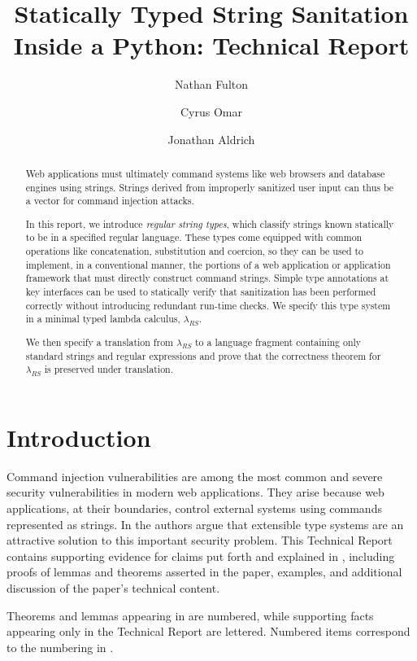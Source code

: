 \documentclass[12pt]{article}
\title{Statically Typed String Sanitation Inside a Python: Technical Report}
\author{Nathan Fulton\and Cyrus Omar\and Jonathan Aldrich}
\theoremstyle{definition}
\begin{document}
\linenumbers

\maketitle

\begin{abstract}
Web applications must ultimately command systems like web browsers and database engines using strings. Strings derived from improperly sanitized user input  can thus be a vector for command injection attacks. 

In this report, we introduce \emph{regular string types}, which classify strings known statically to be in a specified regular language. These types come equipped with common operations like concatenation, substitution and coercion, so they  can be used to implement, in a conventional manner, the portions of a web application or application framework that must directly construct command strings. Simple type annotations at key interfaces can be used to statically verify that sanitization has been performed correctly without introducing redundant run-time checks. We specify this type system in a minimal typed lambda calculus, $\lambda_{RS}$.

We then specify a translation from $\lambda_{RS}$ to a language fragment containing only standard strings and regular expressions and prove that the correctness theorem for
$\lambda_{RS}$ is preserved under translation.
\end{abstract}

\section{Introduction}

Command injection vulnerabilities are among the most common and severe security vulnerabilities in modern web applications.  They arise because web applications, at their boundaries, control external systems using commands represented as  strings. In \cite{fulton2014} the authors argue that extensible type systems are an attractive solution to this important security problem. This Technical Report contains supporting evidence for claims put forth and explained in \cite{fulton2014}, including proofs of lemmas
and theorems asserted in the paper, examples, and additional discussion of the paper's technical content.

Theorems and lemmas appearing in \cite{fulton2014} are numbered, while supporting facts appearing only in the Technical Report are lettered.
Numbered items correspond to the numbering in \cite{fulton2014}.
\end{document}
